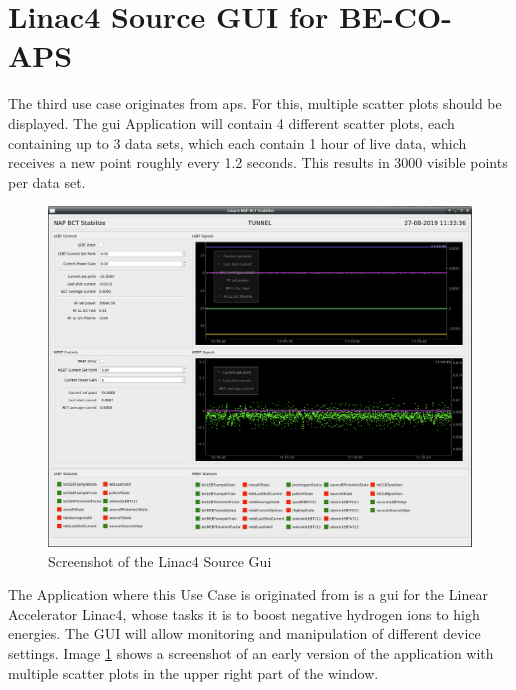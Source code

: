 \section{Linac4 Source GUI for BE-CO-APS}
\label{sec:usecases:linac}

The third use case originates from \gls{aps}. For this, multiple scatter plots
should be displayed. The \gls{gui} Application will contain 4 different scatter
plots, each containing up to 3 data sets, which each contain 1 hour of live
data, which receives a new point roughly every 1.2 seconds. This results in 3000
visible points per data set.

\begin{figure}[h]
    \centering
    \includegraphics[width=15cm]{resources/img/Linac4SourceGui}
    \caption{Screenshot of the Linac4 Source Gui}
    \label{fig:linac4sourcegui}
\end{figure}

The Application where this Use Case is originated from is a \gls{gui} for the
Linear Accelerator Linac4, whose tasks it is to boost negative hydrogen ions to
high energies. The GUI will allow monitoring and manipulation of different
device settings. Image \ref{fig:linac4sourcegui} shows a screenshot of an early
version of the application with multiple scatter plots in the upper right part
of the window.
\cite{LinacFour,LinacFourGuiPres}

